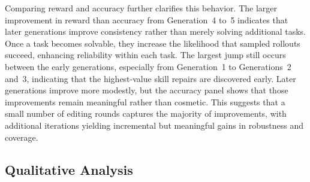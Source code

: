 Comparing reward and accuracy further clarifies this behavior. The larger improvement in reward than accuracy from Generation~4 to~5 indicates that later generations improve consistency rather than merely solving additional tasks. Once a task becomes solvable, they increase the likelihood that sampled rollouts succeed, enhancing reliability within each task. The largest jump still occurs between the early generations, especially from Generation~1 to Generations~2 and~3, indicating that the highest-value skill repairs are discovered early. Later generations improve more modestly, but the accuracy panel shows that those improvements remain meaningful rather than cosmetic. This suggests that a small number of editing rounds captures the majority of improvements, with additional iterations yielding incremental but meaningful gains in robustness and coverage.

\subsection{Qualitative Analysis}


